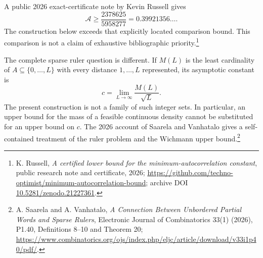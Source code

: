 \documentclass[11pt,a4paper]{article}
\theoremstyle{remark}\newtheorem{remark}[theorem]{Remark}
\begin{document}
A public 2026 exact-certificate note by Kevin Russell gives
\[
 \mathcal A\ge\frac{2378625}{5958277}=0.39921356\ldots.
\]
The construction below exceeds that explicitly located comparison bound. This comparison is not a claim of exhaustive bibliographic priority.\footnote{K. Russell, \emph{A certified lower bound for the minimum-autocorrelation constant}, public research note and certificate, 2026; \url{https://github.com/techno-optimist/minimum-autocorrelation-bound}; archive DOI \href{https://doi.org/10.5281/zenodo.21227361}{10.5281/zenodo.21227361}.}

The complete sparse ruler question is different. If $M(L)$ is the least cardinality of $A\subseteq\{0,\ldots,L\}$ with every distance $1,\ldots,L$ represented, its asymptotic constant is
\[
 c=\lim_{L\to\infty}\frac{M(L)}{\sqrt L}.
\]
The present construction is not a family of such integer sets. In particular, an upper bound for the mass of a feasible continuous density cannot be substituted for an upper bound on $c$. The 2026 account of Saarela and Vanhatalo gives a self-contained treatment of the ruler problem and the Wichmann upper bound.\footnote{A. Saarela and A. Vanhatalo, \emph{A Connection Between Unbordered Partial Words and Sparse Rulers}, Electronic Journal of Combinatorics 33(1) (2026), P1.40, Definitions 8--10 and Theorem 20; \url{https://www.combinatorics.org/ojs/index.php/eljc/article/download/v33i1p40/pdf/}.}
\end{document}
